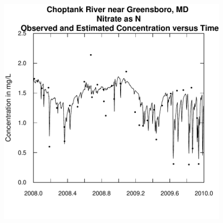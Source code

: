 \documentclass[a4paper,11pt]{article}
\begin{document}
\begin{figure}[htbp]
\begin{minipage}[h]{0.5\linewidth}
\begin{center}
\includegraphics{EGRET-figplotConcTimeDaily}
    \label{fig:plotConcTimeDaily}
    \end{center}
  \end{minipage}
  \caption{}
  \label{fig:boxResidMonthANDplotConcTimeDaily}
\end{figure}
\end{document}
